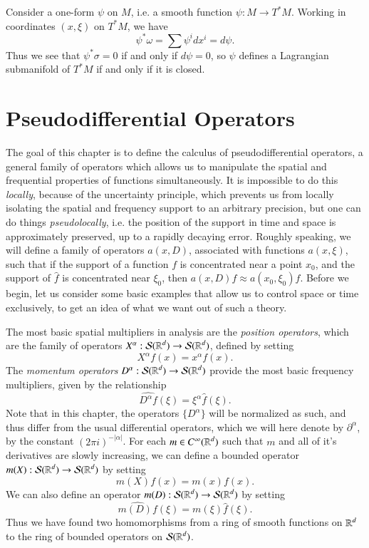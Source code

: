 \begin{example}
    Consider a one-form $\psi$ on $M$, i.e. a smooth function $\psi: M \to T^* M$. Working in coordinates $(x,\xi)$ on $T^* M$, we have
    \[ \psi^* \omega = \sum \psi^i dx^i = d\psi. \]
    Thus we see that $\psi^* \sigma = 0$ if and only if $d\psi = 0$, so $\psi$ defines a Lagrangian submanifold of $T^* M$ if and only if it is closed.
\end{example}




















\chapter{Pseudodifferential Operators}

The goal of this chapter is to define the calculus of pseudodifferential operators, a general family of operators which allows us to manipulate the spatial and frequential properties of functions simultaneously. It is impossible to do this \emph{locally}, because of the uncertainty principle, which prevents us from locally isolating the spatial and frequency support to an arbitrary precision, but one can do things \emph{pseudolocally}, i.e. the position of the support in time and space is approximately preserved, up to a rapidly decaying error. Roughly speaking, we will define a family of operators $a(x,D)$, associated with functions $a(x,\xi)$, such that if the support of a function $f$ is concentrated near a point $x_0$, and the support of $\widehat{f}$ is concentrated near $\xi_0$, then $a(x,D) f \approx a(x_0,\xi_0) f$. Before we begin, let us consider some basic examples that allow us to control space or time exclusively, to get an idea of what we want out of such a theory.

The most basic spatial multipliers in analysis are the \emph{position operators}, which are the family of operators $X^\alpha: \mathcal{S}(\operatorname{\mathbb{R}}^d) \to \mathcal{S}(\operatorname{\mathbb{R}}^d)$, defined by setting
%
\[ X^\alpha f(x) = x^\alpha f(x). \]
%
The \emph{momentum operators} $D^\alpha: \mathcal{S}(\operatorname{\mathbb{R}}^d) \to \mathcal{S}(\operatorname{\mathbb{R}}^d)$ provide the most basic frequency multipliers, given by the relationship
%
\[ \widehat{D^\alpha f}(\xi) = \xi^\alpha \widehat{f}(\xi). \]
%
Note that in this chapter, the operators $\{ D^\alpha \}$ will be normalized as such, and thus differ from the usual differential operators, which we will here denote by $\partial^\alpha$, by the constant $(2 \pi i)^{-|\alpha|}$. For each $m \in C^\infty(\operatorname{\mathbb{R}}^d)$ such that $m$ and all of it's derivatives are slowly increasing, we can define a bounded operator $m(X): \mathcal{S}(\operatorname{\mathbb{R}}^d) \to \mathcal{S}(\operatorname{\mathbb{R}}^d)$ by setting
%
\[ m(X) f(x) = m(x) f(x). \]
%
We can also define an operator $m(D): \mathcal{S}(\operatorname{\mathbb{R}}^d) \to \mathcal{S}(\operatorname{\mathbb{R}}^d)$ by setting
%
\[ \widehat{m(D) f}(\xi) = m(\xi) \widehat{f}(\xi). \]
%
Thus we have found two homomorphisms from a ring of smooth functions on $\operatorname{\mathbb{R}}^d$ to the ring of bounded operators on $\mathcal{S}(\operatorname{\mathbb{R}}^d)$.

